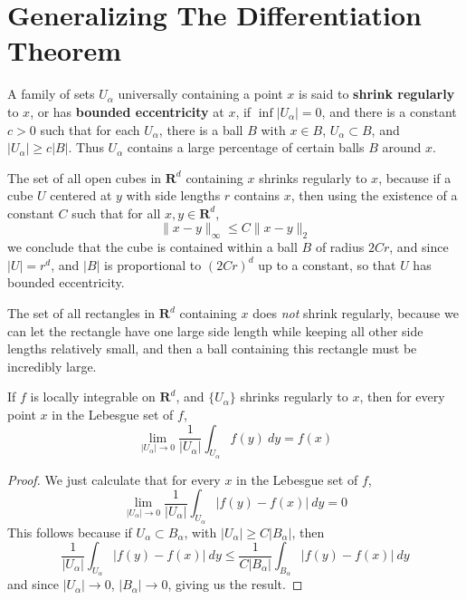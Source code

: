 \section{Generalizing The Differentiation Theorem}

A family of sets $U_\alpha$ universally containing a point $x$ is said to {\bf shrink regularly} to $x$, or has {\bf bounded eccentricity} at $x$, if $\inf |U_\alpha| = 0$, and there is a constant $c > 0$ such that for each $U_\alpha$, there is a ball $B$ with $x \in B$, $U_\alpha \subset B$, and $|U_\alpha| \geq c |B|$. Thus $U_\alpha$ contains a large percentage of certain balls $B$ around $x$.

\begin{example}
    The set of all open cubes in $\mathbf{R}^d$ containing $x$ shrinks regularly to $x$, because if a cube $U$ centered at $y$ with side lengths $r$ contains $x$, then using the existence of a constant $C$ such that for all $x,y \in \mathbf{R}^d$,
    \[ \| x - y \|_\infty \leq C \| x - y \|_2 \]
    we conclude that the cube is contained within a ball $B$ of radius $2Cr$, and since $|U| = r^d$, and $|B|$ is proportional to $(2Cr)^d$ up to a constant, so that $U$ has bounded eccentricity.
\end{example}

\begin{example}
    The set of all rectangles in $\mathbf{R}^d$ containing $x$ does {\it not} shrink regularly, because we can let the rectangle have one large side length while keeping all other side lengths relatively small, and then a ball containing this rectangle must be incredibly large.
\end{example}

\begin{theorem}
    If $f$ is locally integrable on $\mathbf{R}^d$, and $\{ U_\alpha \}$ shrinks regularly to $x$, then for every point $x$ in the Lebesgue set of $f$,
    \[ \lim_{|U_\alpha| \to 0} \frac{1}{|U_\alpha|} \int_{U_\alpha} f(y)\ dy = f(x) \]
\end{theorem}
\begin{proof}
    We just calculate that for every $x$ in the Lebesgue set of $f$,
    \[ \lim_{|U_\alpha| \to 0} \frac{1}{|U_\alpha|} \int_{U_\alpha} |f(y) - f(x)|\ dy = 0 \]
    This follows because if $U_\alpha \subset B_\alpha$, with $|U_\alpha| \geq C|B_\alpha|$, then
    \[ \frac{1}{|U_\alpha|} \int_{U_\alpha} |f(y) - f(x)|\ dy \leq \frac{1}{C|B_\alpha|} \int_{B_\alpha} |f(y) - f(x)|\ dy \]
    and since $|U_\alpha| \to 0$, $|B_\alpha| \to 0$, giving us the result.
\end{proof}

